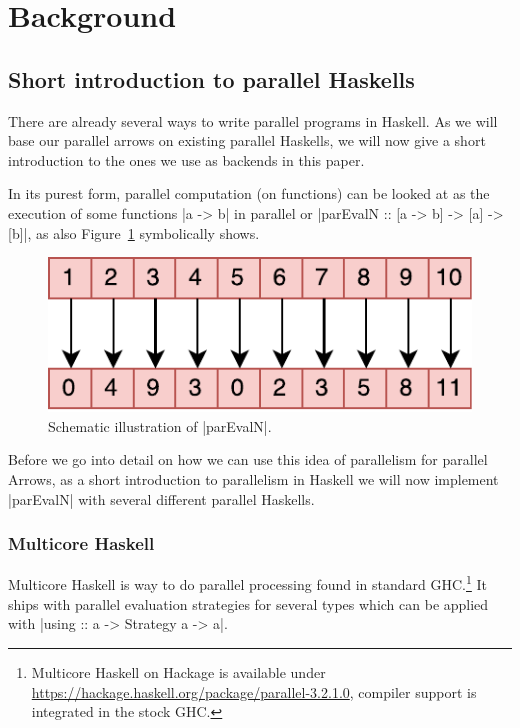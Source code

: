 \begin{flushright}

\end{flushright}\section{Background}
\label{sec:background}
\subsection{Short introduction to parallel Haskells}
\label{sec:parEvalNIntro}
There are already several ways to write parallel programs in Haskell. As we will base our parallel arrows on existing parallel Haskells, we will now give a short introduction to the ones we use as backends in this paper.

In its purest form, parallel computation (on functions) can be looked at as the execution of some functions |a -> b| in parallel or |parEvalN :: [a -> b] -> [a] -> [b]|, as also Figure~\ref{fig:parEvalN} symbolically shows.
\begin{figure}[t]
  \centering
	\includegraphics[scale=0.7]{images/parEvalN}
	\caption{Schematic illustration of |parEvalN|.}
	\label{fig:parEvalN}
\end{figure}
Before we go into detail on how we can use this idea of parallelism for parallel Arrows, as a short introduction to parallelism in Haskell we will now implement |parEvalN| with several different parallel Haskells.

\subsubsection{Multicore Haskell}
Multicore Haskell \cite{Marlow2009,Trinder1998a} is way to do parallel processing found in standard GHC.\footnote{Multicore Haskell on Hackage is available under \url{https://hackage.haskell.org/package/parallel-3.2.1.0}, compiler support is integrated in the stock GHC.} It ships with parallel evaluation strategies for several types which can be applied with |using :: a -> Strategy a -> a|.

